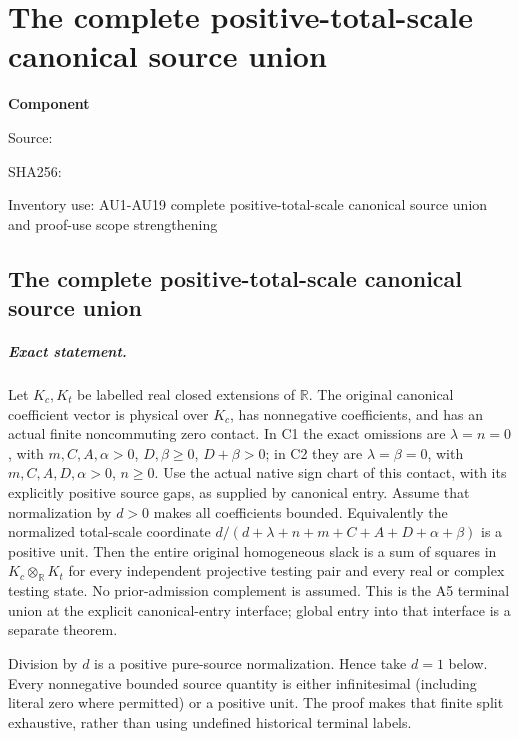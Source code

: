 \chapter{The complete positive-total-scale canonical source union}
\label{component:pc0b2849f8d09}
\noindent\textbf{Component }\par
{\small\noindent Source: \par}
{\small\noindent SHA256: \par}
{\small\noindent Inventory use: AU1-AU19 complete positive-total-scale canonical source union and proof-use scope strengthening\par}
\medskip
\section{The complete positive-total-scale canonical source union}
\label{pc0b2849f8d09:sec:positive-scale-union-rederived}

\paragraph{Exact statement.}
Let \(K_c,K_t\) be labelled real closed extensions of \(\mathbb R\).
The original canonical coefficient vector is physical over \(K_c\),
has nonnegative coefficients, and has an actual finite noncommuting
zero contact. In C1 the exact omissions are \(\lambda=n=0\),
with \(m,C,A,\alpha>0\), \(D,\beta\geq0\), \(D+\beta>0\);
in C2 they are \(\lambda=\beta=0\), with
\(m,C,A,D,\alpha>0\), \(n\geq0\).
Use the actual native sign chart of this contact, with its explicitly
positive source gaps, as supplied by canonical entry.
Assume that normalization by \(d>0\) makes all coefficients bounded.
Equivalently the normalized total-scale coordinate
\(d/(d+\lambda+n+m+C+A+D+\alpha+\beta)\) is a positive unit.
Then the entire original homogeneous slack is a sum of squares
in \(K_c\otimes_{\mathbb R}K_t\) for every independent projective
testing pair and every real or complex testing state.
No prior-admission complement is assumed.
This is the A5 terminal union at the explicit canonical-entry interface;
global entry into that interface is a separate theorem.

Division by \(d\) is a positive pure-source normalization.
Hence take \(d=1\) below. Every nonnegative bounded source quantity
is either infinitesimal (including literal zero where permitted)
or a positive unit. The proof makes that finite split exhaustive,
rather than using undefined historical terminal labels.

